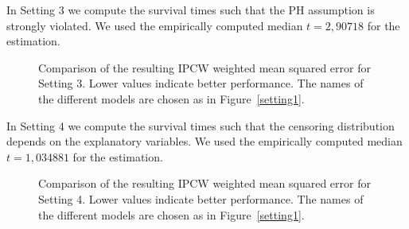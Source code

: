 \documentclass[12pt, a4paper]{scrartcl}
\theoremstyle{definition}
\theoremstyle{plain}
\numberwithin{equation}{section}
\numberwithin{figure}{section}
\numberwithin{table}{section}
\begin{document}
	In Setting 3 we compute the survival times such that the PH assumption is strongly violated.
	We used the empirically computed median $t = 2,90718$ for the estimation.
	
	\begin{figure}\label{setting3}
		\centering	
		
		\vspace{-0.3cm}
		\caption{Comparison of the resulting IPCW weighted mean squared error for Setting 3. Lower values indicate better performance. The names of the different models are chosen as in Figure~\ref{setting1}.}
	\end{figure}
	
	In Setting 4 we compute the survival times such that the censoring distribution depends on the explanatory variables.
	We used the empirically computed median $t = 1,034881$ for the estimation.
	
	\begin{figure}\label{setting4}
		\centering	
		
		\vspace{-0.3cm}
		\caption{Comparison of the resulting IPCW weighted mean squared error for Setting 4. Lower values indicate better performance. The names of the different models are chosen as in Figure~\ref{setting1}.}
	\end{figure}
	
\end{document}

